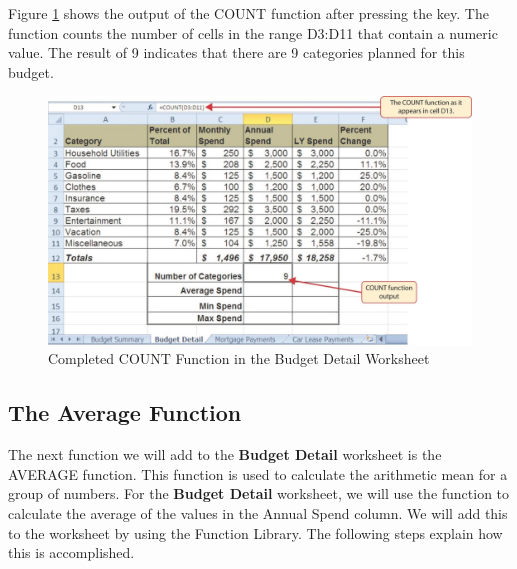 Figure \ref{02:fig18} shows the output of the COUNT function after pressing the  key. The function counts the number of cells in the range \textsf{D3:D11} that contain a numeric value. The result of 9 indicates that there are 9 categories planned for this budget.

\begin{figure}[H]
	\centering
	\includegraphics[width=\maxwidth{.95\linewidth}]{gfx/ch02_fig18}
	\caption{Completed COUNT Function in the Budget Detail Worksheet}
	\label{02:fig18}
\end{figure}

\subsection{The Average Function}

The next function we will add to the \textbf{Budget Detail} worksheet is the AVERAGE function. This function is used to calculate the arithmetic mean for a group of numbers. For the \textbf{Budget Detail} worksheet, we will use the function to calculate the average of the values in the Annual Spend column. We will add this to the worksheet by using the Function Library. The following steps explain how this is accomplished.

